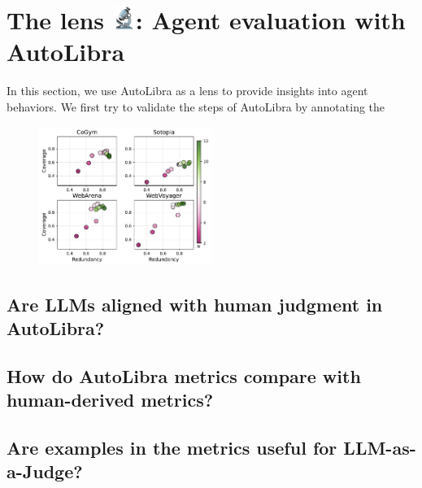 \section{The lens \protect\includegraphics[height=1em]{figs/microscope.png}: Agent evaluation with AutoLibra}
\label{sec:lens}

In this section, we use AutoLibra as a lens to provide insights into agent behaviors. We first try to validate
the steps of AutoLibra by annotating the 

\begin{figure}
    \includegraphics[width=0.5\textwidth]{figs/four_datasets_grid.pdf}
\end{figure}

\subsection{Are LLMs aligned with human judgment in AutoLibra?}



\subsection{How do AutoLibra metrics compare with human-derived metrics?}



\subsection{Are examples in the metrics useful for LLM-as-a-Judge?}

